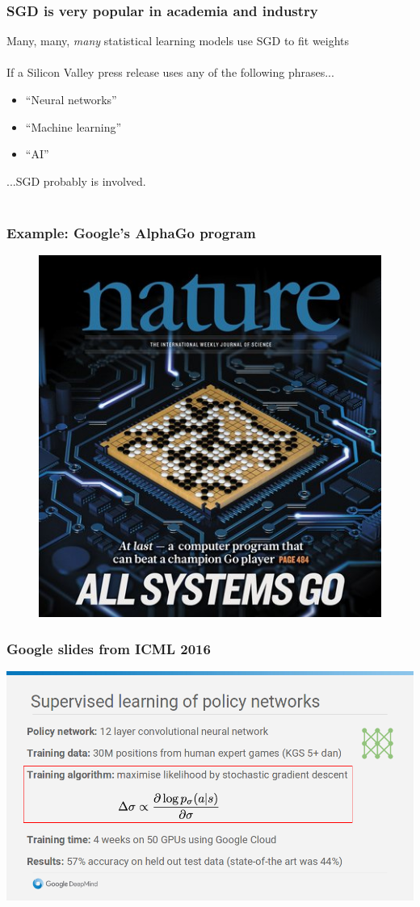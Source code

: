 \documentclass{beamer}
\begin{document}
\begin{frame}
	\frametitle{SGD is very popular in academia and industry}
	Many, many, \textit{many} statistical learning models use SGD to fit weights \\~\\

	If a Silicon Valley press release uses any of the following phrases...
	\begin{itemize}
		\item \small ``Neural networks''
		\item ``Machine learning''
		\item ``AI'' 
	\end{itemize}

	...SGD probably is involved. \\~\\
	
\end{frame}

\begin{frame}
	\frametitle{Example: Google's \textbf{AlphaGo} program}
	\begin{figure}[b]
	\centering
	\includegraphics[scale=0.4]{go}
	\end{figure}
\end{frame}

\begin{frame}
	\frametitle{Google slides from ICML 2016}
	\centering
	\includegraphics[scale=0.3]{screenshot}
\end{frame}
\end{document}
